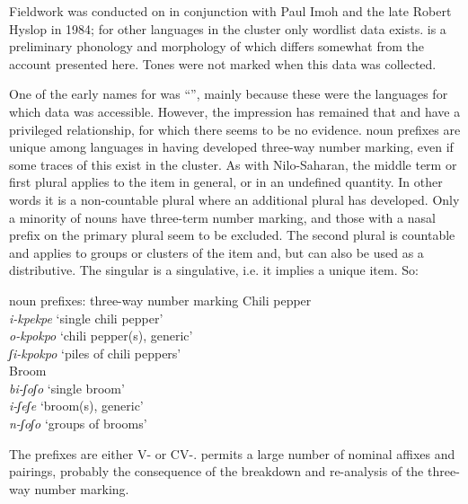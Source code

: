 \documentclass[output=paper]{langsci/langscibook}
\begin{document}
\largerpage[-1]
Fieldwork was conducted on  in conjunction with Paul Imoh and the late Robert Hyslop in 1984; for other languages in the cluster only wordlist data exists. \citet{Imoh2002} is a preliminary phonology and morphology of  which differs somewhat from the account presented here. Tones were not marked when this data was collected.

 
One of the early names for  was ``'', mainly because these were the languages for which data was accessible. However, the impression has remained that  and  have a privileged relationship, for which there seems to be no evidence.  noun prefixes are unique among  languages in having developed three-way number marking, even if some traces of this exist in the  cluster. As with Nilo-Saharan, the middle term or first plural applies to the item in general, or in an undefined quantity. In other words it is a non-countable plural where an additional plural has developed. Only a minority of nouns have three-term number marking, and those with a nasal prefix on the primary plural seem to be excluded. The second plural is countable and applies to groups or clusters of the item and, but can also be used as a distributive. The singular is a singulative, i.e. it implies a unique item. So:

\ea\label{ex:kainji:5}
 noun prefixes: three-way number marking
    \ea Chili pepper\\
   \textit{i-kpekpe} ‘single chili pepper’\\
   \textit{o-kpokpo}  ‘chili pepper(s), generic’ \\
   \textit{ʃi-kpokpo}   ‘piles of chili peppers’ \\
    \ex Broom    \\
   \textit{bi-ʃoʃo} ‘single broom’ \\
   \textit{i-ʃeʃe} ‘broom(s), generic’  \\
     \textit{n-ʃoʃo} ‘groups of brooms’ \\
\z
\z

The prefixes are either V- or CV-.  permits a large number of nominal affixes and pairings, probably the consequence of the breakdown and re-analysis of the three-way number marking.
\end{document}
